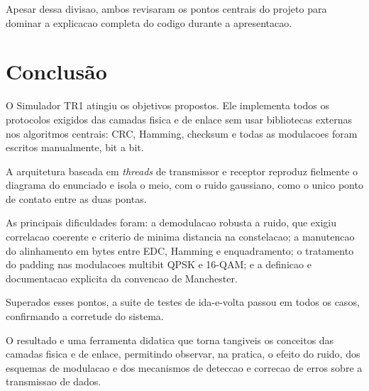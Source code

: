 \documentclass[12pt,a4paper]{article}
\begin{document}
Apesar dessa divisao, ambos revisaram os pontos centrais do projeto para dominar a explicacao completa do codigo durante a apresentacao.

\section{Conclusão}

O Simulador TR1 atingiu os objetivos propostos. Ele implementa todos os protocolos exigidos das camadas fisica e de enlace sem usar bibliotecas externas nos algoritmos centrais: CRC, Hamming, checksum e todas as modulacoes foram escritos manualmente, bit a bit.

A arquitetura baseada em \textit{threads} de transmissor e receptor reproduz fielmente o diagrama do enunciado e isola o meio, com o ruido gaussiano, como o unico ponto de contato entre as duas pontas.

As principais dificuldades foram: a demodulacao robusta a ruido, que exigiu correlacao coerente e criterio de minima distancia na constelacao; a manutencao do alinhamento em bytes entre EDC, Hamming e enquadramento; o tratamento do padding nas modulacoes multibit QPSK e 16-QAM; e a definicao e documentacao explicita da convencao de Manchester.

Superados esses pontos, a suite de testes de ida-e-volta passou em todos os casos, confirmando a corretude do sistema.

O resultado e uma ferramenta didatica que torna tangiveis os conceitos das camadas fisica e de enlace, permitindo observar, na pratica, o efeito do ruido, dos esquemas de modulacao e dos mecanismos de deteccao e correcao de erros sobre a transmissao de dados.
\end{document}
